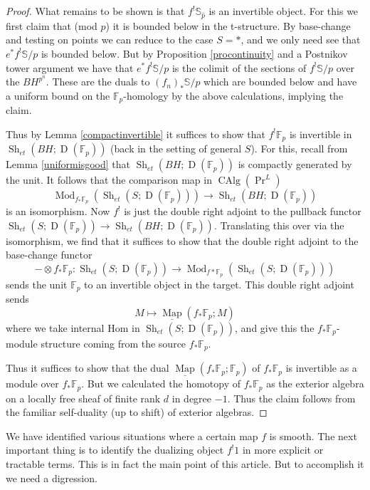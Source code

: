 \documentclass[12pt]{article}
\newcommand{\on}{\operatorname}
\newcommand{\mbb}{\mathbb}
\newcommand{\wh}{\widehat}
\newcommand{\ul}{\underline}
\begin{document}
\begin{proof}
What remains to be shown is that $f^!\mbb{S}_{\wh{p}}$ is an invertible object.  For this we first claim that (mod $p$) it is bounded below in the t-structure.  By base-change and testing on points we can reduce to the case $S=\ast$, and we only need see that $e^\ast f^!\mbb{S}/p$ is bounded below.  But by Proposition \ref{procontinuity} and a Postnikov tower argument we have that $e^\ast f^!\mbb{S}/p$ is the colimit of the sections of $f^!\mbb{S}/p$ over the $BH^{p^n}$. These are the duals to $(f_n)_\ast \mbb{S}/p$ which are bounded below and have a uniform bound on the $\mathbb{F}_p$-homology by the above calculations, implying the claim.

Thus by Lemma \ref{compactinvertible} it suffices to show that $f^!\mbb{F}_p$ is invertible in $\on{Sh}_{et}(BH;\on{D}(\mbb{F}_p))$ (back in the setting of general $S$).  For this, recall from Lemma \ref{uniformisgood} that $\on{Sh}_{et}(BH;\on{D}(\mbb{F}_p))$ is compactly generated by the unit.  It follows that the comparison map in $\on{CAlg}(\on{Pr}^L)$
$$\on{Mod}_{f_\ast\mbb{F}_p}(\on{Sh}_{et}(S;\on{D}(\mbb{F}_p)))\to \on{Sh}_{et}(BH;\on{D}(\mbb{F}_p))$$
is an isomorphism.  Now $f^!$ is just the double right adjoint to the pullback functor $\on{Sh}_{et}(S;\on{D}(\mbb{F}_p))\to\on{Sh}_{et}(BH;\on{D}(\mbb{F}_p))$.  Translating this over via the isomorphism, we find that it suffices to show that the double right adjoint to the base-change functor
$$-\otimes f_\ast \mbb{F}_p: \on{Sh}_{et}(S;\on{D}(\mbb{F}_p))\to \on{Mod}_{f\ast\mbb{F}_p}(\on{Sh}_{et}(S;\on{D}(\mbb{F}_p)))$$
sends the unit $\mbb{F}_p$ to an invertible object in the target.  This double right adjoint sends
$$M\mapsto \ul{\on{Map}}(f_\ast\mbb{F}_p;M)$$
where we take internal Hom in $\on{Sh}_{et}(S;\on{D}(\mbb{F}_p))$, and give this the $f_\ast\mbb{F}_p$-module structure coming from the source $f_\ast\mbb{F}_p$.

Thus it suffices to show that the dual $\ul{\on{Map}}(f_\ast\mbb{F}_p;\mbb{F}_p)$ of $f_\ast\mbb{F}_p$ is invertible as a module over $f_\ast \mbb{F}_p$.  But we calculated the homotopy of $f_\ast\mbb{F}_p$ as the exterior algebra on a locally free sheaf of finite rank $d$ in degree $-1$.  Thus the claim follows from the familiar self-duality (up to shift) of exterior algebras.
\end{proof}

We have identified various situations where a certain map $f$ is smooth.  The next important thing is to identify the dualizing object $f^!1$ in more explicit or tractable terms.  This is in fact the main point of this article.  But to accomplish it we need a digression.
\end{document}
